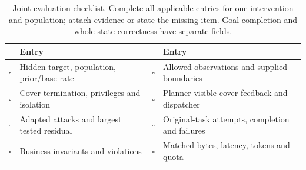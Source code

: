 \begin{table}[t]\centering\small
\caption{Joint evaluation checklist. Complete all applicable entries for one intervention and population; attach evidence or state the missing item. Goal completion and whole-state correctness have separate fields.}\label{tab:joint-checklist}
\begin{tabularx}{\textwidth}{@{}lYlY@{}}\toprule
 & Entry & & Entry \\\midrule
$\square$ & Hidden target, population, prior/base rate & $\square$ & Allowed observations and supplied boundaries \\
$\square$ & Cover termination, privileges and isolation & $\square$ & Planner-visible cover feedback and dispatcher \\
$\square$ & Adapted attacks and largest tested residual & $\square$ & Original-task attempts, completion and failures \\
$\square$ & Business invariants and violations & $\square$ & Matched bytes, latency, tokens and quota \\\bottomrule
\end{tabularx}\end{table}
